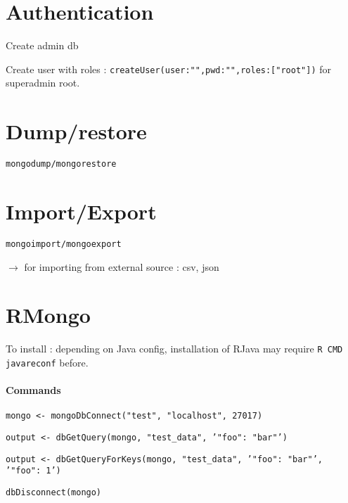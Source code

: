 \section*{Authentication}

Create admin db

Create user with roles : \texttt{createUser({user:"",pwd:"",roles:["root"]})} for superadmin root.


\section*{Dump/restore}

\texttt{mongodump/mongorestore}


\section*{Import/Export}

\texttt{mongoimport/mongoexport}

$\rightarrow$ for importing from external source : csv, json



\section*{RMongo}

To install : depending on Java config, installation of RJava may require \texttt{R CMD javareconf} before.


\paragraph{Commands}

\texttt{mongo <- mongoDbConnect("test", "localhost", 27017)}

\texttt{output <- dbGetQuery(mongo, "test_data",
'{"foo": "bar"}')}

\texttt{output <- dbGetQueryForKeys(mongo, "test_data",
'{"foo": "bar"}', '{"foo": 1}')}

\texttt{dbDisconnect(mongo)}
















